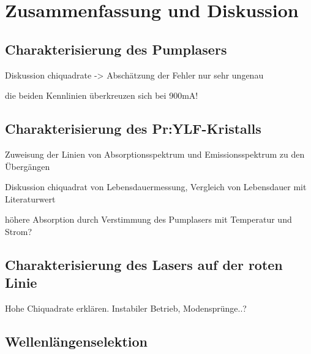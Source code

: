 \section{Zusammenfassung und Diskussion}

\subsection{Charakterisierung des Pumplasers}

Diskussion chiquadrate -> Abschätzung der Fehler nur sehr ungenau

die beiden Kennlinien überkreuzen sich bei 900mA!

\subsection{Charakterisierung des Pr:YLF-Kristalls}

Zuweisung der Linien von Absorptionsspektrum und Emissionsspektrum zu den Übergängen 

Diskussion chiquadrat von Lebensdauermessung, Vergleich von Lebensdauer mit Literaturwert

höhere Absorption durch Verstimmung des Pumplasers mit Temperatur und Strom?

\subsection{Charakterisierung des Lasers auf der roten Linie}
Hohe Chiquadrate erklären. Instabiler Betrieb, Modensprünge..?


\subsection{Wellenlängenselektion}